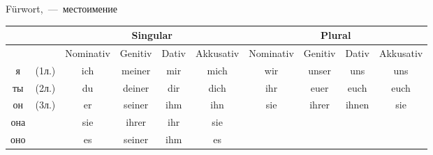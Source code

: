 
 F\"urwort,~---~местоимение

\begin{longtable}{|cc|c|c|c|c|c|c|c|c|}
\hline
 & & \multicolumn{4}{|c|}{Singular} & \multicolumn{4}{|c|}{Plural} \\
\hline
 & & Nominativ & Genitiv & Dativ & Akkusativ & Nominativ & Genitiv & Dativ & Akkusativ \\
\hline
я & (1л.) & ich & meiner & mir & mich & wir & unser & uns & uns \\
\hline
ты & (2л.) & du & deiner & dir & dich & ihr & euer & euch & euch \\
\hline
он & \multirow{3}{*}{(3л.)} & er & seiner & ihm & ihn & \multirow{3}{*}{sie} & \multirow{3}{*}{ihrer} & \multirow{3}{*}{ihnen} & \multirow{3}{*}{sie} \\
она & & sie & ihrer & ihr & sie & & & & \\
оно & & es & seiner & ihm & es & & & & \\
\hline
\end{longtable}
